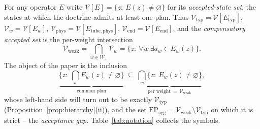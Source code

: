 \documentclass[preprint,11pt,authoryear]{elsarticle}
\theoremstyle{definition}
\theoremstyle{remark}
\newcommand{\Etyp}{E_{\mathrm{typ}}}
\newcommand{\Eend}{E_{\mathrm{end}}}
\newcommand{\Ephys}{E_{\mathrm{tube,phys}}}
\newcommand{\Vtyp}{\mathcal{V}_{\mathrm{typ}}}
\newcommand{\Vweak}{\mathcal{V}_{\mathrm{weak}}}
\newcommand{\Vphys}{\mathcal{V}_{\mathrm{phys}}}
\newcommand{\Vend}{\mathcal{V}_{\mathrm{end}}}
\newcommand{\Wp}{W_+}
\newcommand{\FP}{\mathrm{FP}_{\mathrm{agg}}}
\begin{document}
For any operator $E$ write $\mathcal V[E]=\{z:\ E(z)\ne\varnothing\}$ for its \emph{accepted-state set}, the states at which the doctrine admits at least one plan. Thus $\Vtyp=\mathcal V[\Etyp]$, $\mathcal V_w=\mathcal V[E_w]$, $\Vphys=\mathcal V[\Ephys]$, $\Vend=\mathcal V[\Eend]$, and the \emph{compensatory accepted set} is the per-weight intersection
\begin{equation}
\Vweak=\bigcap_{w\in\Wp}\mathcal V_w=\{z:\ \forall w\ \exists a_w\in E_w(z)\}.
\label{eq:Vweak}
\end{equation}
The object of the paper is the inclusion
\begin{equation}
\underbrace{\{z:\ \textstyle\bigcap_w E_w(z)\neq\varnothing\}}_{\text{common plan}}\ \subseteq\ \underbrace{\bigcap_w\{z:\ E_w(z)\neq\varnothing\}}_{\text{per weight}\ =\ \Vweak},
\label{eq:central}
\end{equation}
whose left-hand side will turn out to be exactly $\Vtyp$ (Proposition~\ref{prop:hierarchy}(ii)), and the set $\FP=\Vweak\setminus\Vtyp$ on which it is strict -- the \emph{acceptance gap}. Table~\ref{tab:notation} collects the symbols.
\end{document}
